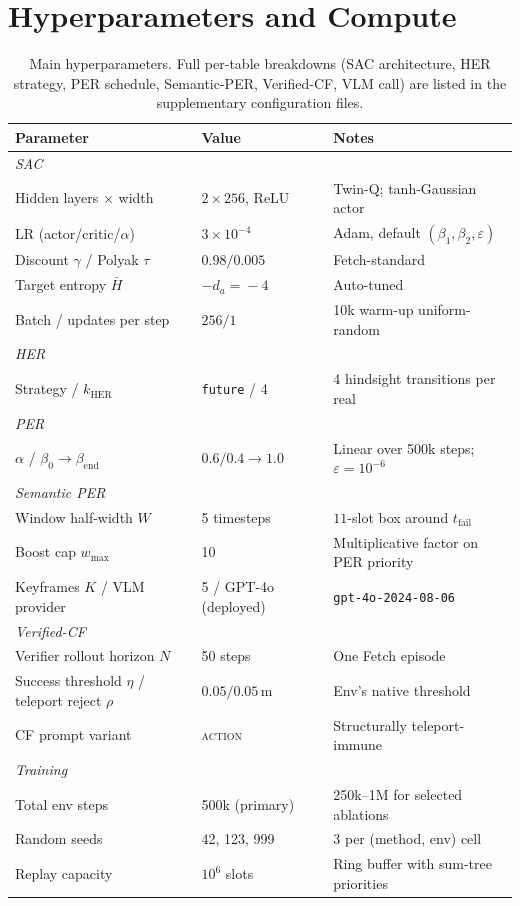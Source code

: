 \section{Hyperparameters and Compute}
\label{app:hparams}

\begin{table}[!t]
\centering
\footnotesize
\caption{Main hyperparameters. Full per-table breakdowns (SAC
architecture, HER strategy, PER schedule, Semantic-PER, Verified-CF, VLM
call) are listed in the supplementary configuration files.}
\label{tab:hparams-main}
\begin{tabular}{@{}l l l@{}}
\toprule
Parameter & Value & Notes \\
\midrule
\multicolumn{3}{l}{\textit{SAC} \citep{haarnoja2018sac}} \\
Hidden layers $\times$ width & $2 \times 256$, ReLU & Twin-Q; tanh-Gaussian actor \\
LR (actor/critic/$\alpha$) & $3\!\times\!10^{-4}$ & Adam, default $(\beta_1,\beta_2,\varepsilon)$ \\
Discount $\gamma$ / Polyak $\tau$ & $0.98 / 0.005$ & Fetch-standard \\
Target entropy $\bar H$ & $-d_a\!=\!-4$ & Auto-tuned \\
Batch / updates per step & $256 / 1$ & 10k warm-up uniform-random \\
\midrule
\multicolumn{3}{l}{\textit{HER} \citep{andrychowicz2017her}} \\
Strategy / $k_{\text{HER}}$ & \texttt{future} / 4 & 4 hindsight transitions per real \\
\midrule
\multicolumn{3}{l}{\textit{PER} \citep{schaul2016per}} \\
$\alpha$ / $\beta_0\!\to\!\beta_{\text{end}}$ & $0.6 / 0.4\!\to\!1.0$ & Linear over 500k steps; $\varepsilon\!=\!10^{-6}$ \\
\midrule
\multicolumn{3}{l}{\textit{Semantic PER}} \\
Window half-width $W$ & 5 timesteps & $11$-slot box around $t_{\text{fail}}$ \\
Boost cap $w_{\max}$ & 10 & Multiplicative factor on PER priority \\
Keyframes $K$ / VLM provider & 5 / GPT-4o (deployed) & \texttt{gpt-4o-2024-08-06} \\
\midrule
\multicolumn{3}{l}{\textit{Verified-CF}} \\
Verifier rollout horizon $N$ & 50 steps & One Fetch episode \\
Success threshold $\eta$ / teleport reject $\rho$ & $0.05 / 0.05$\,m & Env's native threshold \\
CF prompt variant & \textsc{action} & Structurally teleport-immune \\
\midrule
\multicolumn{3}{l}{\textit{Training}} \\
Total env steps & 500k (primary) & 250k--1M for selected ablations \\
Random seeds & 42, 123, 999 & 3 per (method, env) cell \\
Replay capacity & $10^6$ slots & Ring buffer with sum-tree priorities \\
\bottomrule
\end{tabular}
\end{table}

